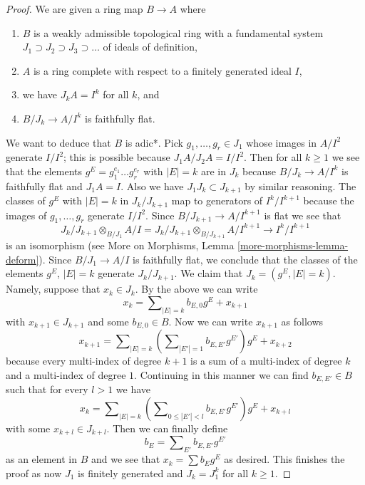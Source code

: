 \begin{proof}
\medskip\noindent
We are given a ring map $B \to A$ where
\begin{enumerate}
\item $B$ is a weakly admissible topological ring with a fundamental system
$J_1 \supset J_2 \supset J_3 \supset \ldots$ of ideals of definition,
\item $A$ is a ring complete with respect to a finitely generated
ideal $I$,
\item we have $J_k A = I^k$ for all $k$, and
\item $B/J_k \to A/I^k$ is faithfully flat.
\end{enumerate}
We want to deduce that $B$ is adic*.
Pick $g_1, \ldots, g_r \in J_1$
whose images in $A/I^2$ generate $I/I^2$; this is possible because
$J_1A/J_2A = I/I^2$. Then for all $k \geq 1$ we see that the elements
$g^E = g_1^{e_1} \ldots g_r^{e_r}$ with $|E| = k$ are in $J_k$
because $B/J_k \to A/I^k$ is faithfully flat and $J_1A = I$.
Also we have $J_1 J_k \subset J_{k + 1}$ by similar reasoning.
The classes of $g^E$ with $|E| = k$ in $J_k/J_{k + 1}$ map to
generators of $I^k/I^{k + 1}$ because the images of $g_1, \ldots, g_r$
generate $I/I^2$. Since $B/J_{k + 1} \to A/I^{k + 1}$
is flat we see that
$$
J_k/J_{k + 1} \otimes_{B/J_1} A/I =
J_k/J_{k + 1} \otimes_{B/J_{k + 1}} A/I^{k + 1} \to I^k/I^{k + 1}
$$
is an isomorphism (see More on Morphisms, Lemma
\ref{more-morphisms-lemma-deform}). Since $B/J_1 \to A/I$ is
faithfully flat, we conclude that the classes of the elements
$g^E$, $|E| = k$ generate $J_k/J_{k + 1}$. We claim that
$J_k = (g^E, |E| = k)$. Namely, suppose that $x_k \in J_k$.
By the above we can write
$$
x_k = \sum\nolimits_{|E| = k} b_{E, 0} g^E + x_{k + 1}
$$
with $x_{k + 1} \in J_{k + 1}$ and some $b_{E, 0} \in B$. Now we can write
$x_{k + 1}$ as follows
$$
x_{k + 1} =
\sum\nolimits_{|E| = k}
\left(\sum\nolimits_{|E'| = 1} b_{E, E'}g^{E'}\right) g^E + x_{k + 2}
$$
because every multi-index of degree $k + 1$ is a sum of a multi-index
of degree $k$ and a multi-index of degree $1$. Continuing in this
manner we can find $b_{E, E'} \in B$ such that for every $l > 1$
we have
$$
x_k = \sum\nolimits_{|E| = k}
\left(\sum\nolimits_{0 \leq |E'| < l} b_{E, E'} g^{E'}\right) g^E + x_{k + l}
$$
with some $x_{k + l} \in J_{k + l}$. Then we can finally define
$$
b_E = \sum\nolimits_{E'} b_{E, E'} g^{E'}
$$
as an element in $B$ and we see that $x_k = \sum b_E g^E$ as desired.
This finishes the proof as now $J_1$ is finitely generated and $J_k = J_1^k$
for all $k \geq 1$.
\end{proof}

